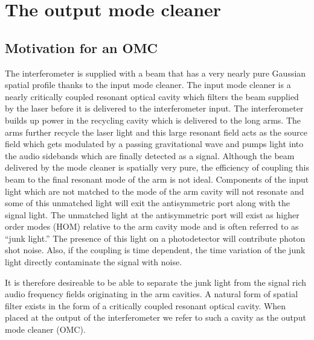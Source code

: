 \chapter{The output mode cleaner}

\section{Motivation for an OMC}
The interferometer is supplied with a beam that has a very nearly pure Gaussian spatial profile thanks to the input mode cleaner. %
The input mode cleaner is a nearly critically coupled resonant optical cavity which filters the beam supplied by the laser before it is delivered to the interferometer input. %
The interferometer builds up power in the recycling cavity which is delivered to the long arms. %
The arms further recycle the laser light and this large resonant field acts as the source field which gets modulated by a passing gravitational wave and pumps light into the audio sidebands which are finally detected as a signal. %
Although the beam delivered by the mode cleaner is spatially very pure, the efficiency of coupling this beam to the final resonant mode of the arm is not ideal. %
Components of the input light which are not matched to the mode of the arm cavity will not resonate and some of this unmatched light will exit the antisymmetric port along with the signal light. %
The unmatched light at the antisymmetric port will exist as higher order modes (HOM) relative to the arm cavity mode and is often referred to as ``junk light.'' %
The presence of this light on a photodetector will contribute photon shot noise. %
Also, if the coupling is time dependent, the time variation of the junk light directly contaminate the signal with noise.

It is therefore desireable to be able to separate the junk light from the signal rich audio frequency fields originating in the arm cavities. %
A natural form of spatial filter exists in the form of a critically coupled resonant optical cavity. %
When placed at the output of the interferometer we refer to such a cavity as the output mode cleaner (OMC).

